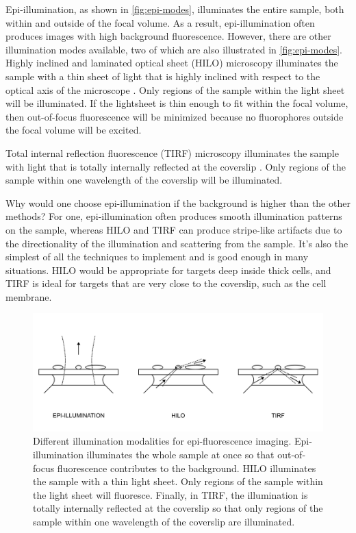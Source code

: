 \documentclass[10pt,a4paper,oneside]{book}
\begin{document}
Epi-illumination, as shown in \autoref{fig:epi-modes}, illuminates the entire sample, both within and outside of the focal volume. As a result, epi-illumination often produces images with high background fluorescence. However, there are other illumination modes available, two of which are also illustrated in \autoref{fig:epi-modes}. Highly inclined and laminated optical sheet (HILO) microscopy illuminates the sample with a thin sheet of light that is highly inclined with respect to the optical axis of the microscope \cite{tokunaga-naturemethods-2008}. Only regions of the sample within the light sheet will be illuminated. If the lightsheet is thin enough to fit within the focal volume, then out-of-focus fluorescence will be minimized because no fluorophores outside the focal volume will be excited.

Total internal reflection fluorescence (TIRF) microscopy illuminates the sample with light that is totally internally reflected at the coverslip \cite{axelrod-traffic-2001}. Only regions of the sample within one wavelength of the coverslip will be illuminated.

Why would one choose epi-illumination if the background is higher than the other methods? For one, epi-illumination often produces smooth illumination patterns on the sample, whereas HILO and TIRF can produce stripe-like artifacts due to the directionality of the illumination and scattering from the sample. It's also the simplest of all the techniques to implement and is good enough in many situations. HILO would be appropriate for targets deep inside thick cells, and TIRF is ideal for targets that are very close to the coverslip, such as the cell membrane.

\begin{figure}[ht]
    \centering
    \includegraphics[width=1.0\textwidth]{epi-illumination-modalities.png}
    \caption{Different illumination modalities for epi-fluorescence imaging. Epi-illumination illuminates the whole sample at once so that out-of-focus fluorescence contributes to the background. HILO illuminates the sample with a thin light sheet. Only regions of the sample within the light sheet will fluoresce. Finally, in TIRF, the illumination is totally internally reflected at the coverslip so that only regions of the sample within one wavelength of the coverslip are illuminated.}
    \label{fig:epi-modes}
\end{figure}
\end{document}
